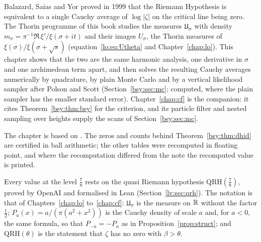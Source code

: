 \label{chap:bsy}\label{bsy:sec:intro}

Balazard, Saias and Yor \cite{BSY99} proved in 1999 that the Riemann Hypothesis is equivalent to a single Cauchy average of $\log|\zeta|$ on the critical line being zero. The Thorin programme of this book studies the measures $\mathfrak U_\sigma$ with density $m_\sigma=\pi^{-1}\Re\,\xi'/\xi(\sigma+it)$ and their images $U_\sigma$, the Thorin measures of $\xi(\sigma)/\xi(\sigma+\sqrt s)$ (equation~\eqref{lo:eq:Utheta} and Chapter~\ref{chap:lo}). This chapter shows that the two are the same harmonic analysis, one derivative in $\sigma$ and one archimedean term apart, and then solves the resulting Cauchy averages numerically by quadrature, by plain Monte Carlo and by a vertical likelihood sampler after Polson and Scott (Section~\ref{bsy:sec:mc}; computed, where the plain sampler has the smaller standard error). Chapter~\ref{chap:cf} is the companion: it cites Theorem~\ref{bsy:thm:bsy} for the criterion, and its particle filter and nested sampling over heights supply the scans of Section~\ref{bsy:sec:mc}.

The chapter is based on \cite{P26bsy}. The zeros and counts behind Theorem~\ref{bsy:thm:dhid} are certified in ball arithmetic; the other tables were recomputed in floating point, and where the recomputation differed from the note the recomputed value is printed.

Every value at the level $\frac78$ rests on the quasi Riemann hypothesis $\mathrm{QRH}(\frac78)$, proved by OpenAI \cite{OAI26a} and formalised in Lean (Section~\ref{lv:sec:qrh}). The notation is that of Chapters~\ref{chap:lo} to~\ref{chap:cf}: $\mathfrak U_\sigma$ is the measure on $\mathbb{R}$ without the factor $\frac12$; $P_a(x)=a/(\pi(a^2+x^2))$ is the Cauchy density of scale $a$ and, for $a<0$, the same formula, so that $P_{-a}=-P_a$ as in Proposition~\ref{prop:struct}; and $\mathrm{QRH}(\theta)$ is the statement that $\zeta$ has no zero with $\beta>\theta$.

